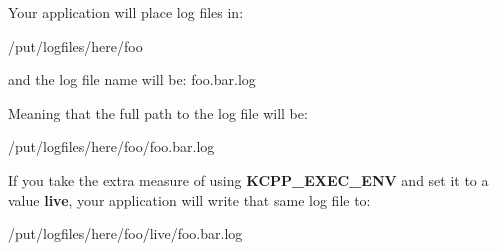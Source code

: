 Your application will place log files in\-:
\begin{DoxyItemize}
\item /put/logfiles/here/foo
\item and the log file name will be\-: foo.\-bar.\-log
\end{DoxyItemize}

Meaning that the full path to the log file will be\-:
\begin{DoxyItemize}
\item /put/logfiles/here/foo/foo.bar.\-log
\end{DoxyItemize}

If you take the extra measure of using {\bfseries K\-C\-P\-P\-\_\-\-E\-X\-E\-C\-\_\-\-E\-N\-V} and set it to a value {\bfseries live}, your application will write that same log file to\-:
\begin{DoxyItemize}
\item /put/logfiles/here/foo/live/foo.bar.\-log 
\end{DoxyItemize}